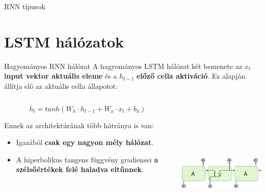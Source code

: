 \documentclass[english, aspectratio=169]{beamer}
\makeatletter
\let\origtableofcontents=\tableofcontents
\def\tableofcontents{\@ifnextchar[{\origtableofcontents}{\gobbletableofcontents}}
\def\gobbletableofcontents#1{\origtableofcontents}
\makeatother
\begin{document}
\begin{frame}{RNN típusok}
{\begin{center}
\end{center}}
\end{frame}

\section{LSTM hálózatok}

\begin{frame}
\tableofcontents[currentsection]
\end{frame}

\begin{frame}{Hagyományos RNN hálózat}
A hagyományos LSTM hálózat két bemenete az $x_t$  \textbf{input vektor aktuális eleme} és a $h_{t-1}$ \textbf{előző cella aktiváció}. Ez alapján állítja elő az aktuális cella állapotot:
\begin{columns}
\begin{column}{.5\textwidth}
\begin{block}{}
\vspace{-0.5cm}
\[
h_t = tanh\left(W_h \cdot h_{t-1} + W_x \cdot x_t + b_h\right)
\]
\end{block}
Ennek az architektúrának több hátránya is van:
\begin{itemize}
	\item Igazából \textbf{csak egy nagyon mély hálózat}. 
	\item A hiperbolikus tangens függvény gradiensei \textbf{a szélsőértékek felé haladva eltűnnek}. 
\end{itemize}
\end{column}
\begin{column}{.5\textwidth}
\begin{center}
\includegraphics[height=7cm, width=7cm, keepaspectratio]{images/recurrent_5.png}
\end{center}
\end{column}
\end{columns}
\end{frame}
\end{document}

